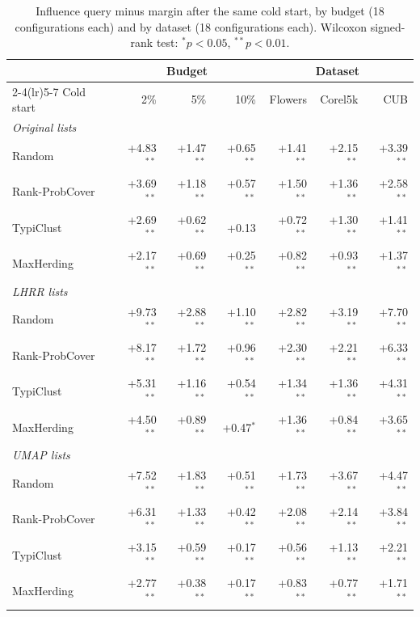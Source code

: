 \begin{table}[t]
\centering
\caption{Influence query minus margin after the same cold start, by budget (18 configurations each) and by dataset (18 configurations each). Wilcoxon signed-rank test: $^{*}p<0.05$, $^{**}p<0.01$.}
\label{tab:supp-plugin-breakdown}
\footnotesize
\begin{tabular}{lrrrrrr}
\toprule
& \multicolumn{3}{c}{Budget} & \multicolumn{3}{c}{Dataset} \\
\cmidrule(lr){2-4}\cmidrule(lr){5-7}
Cold start & 2\% & 5\% & 10\% & Flowers & Corel5k & CUB \\
\midrule
\multicolumn{7}{l}{\textit{Original lists}} \\
\quad Random & +4.83$^{**}$ & +1.47$^{**}$ & +0.65$^{**}$ & +1.41$^{**}$ & +2.15$^{**}$ & +3.39$^{**}$ \\
\quad Rank-ProbCover & +3.69$^{**}$ & +1.18$^{**}$ & +0.57$^{**}$ & +1.50$^{**}$ & +1.36$^{**}$ & +2.58$^{**}$ \\
\quad TypiClust & +2.69$^{**}$ & +0.62$^{**}$ & +0.13 & +0.72$^{**}$ & +1.30$^{**}$ & +1.41$^{**}$ \\
\quad MaxHerding & +2.17$^{**}$ & +0.69$^{**}$ & +0.25$^{**}$ & +0.82$^{**}$ & +0.93$^{**}$ & +1.37$^{**}$ \\
\multicolumn{7}{l}{\textit{LHRR lists}} \\
\quad Random & +9.73$^{**}$ & +2.88$^{**}$ & +1.10$^{**}$ & +2.82$^{**}$ & +3.19$^{**}$ & +7.70$^{**}$ \\
\quad Rank-ProbCover & +8.17$^{**}$ & +1.72$^{**}$ & +0.96$^{**}$ & +2.30$^{**}$ & +2.21$^{**}$ & +6.33$^{**}$ \\
\quad TypiClust & +5.31$^{**}$ & +1.16$^{**}$ & +0.54$^{**}$ & +1.34$^{**}$ & +1.36$^{**}$ & +4.31$^{**}$ \\
\quad MaxHerding & +4.50$^{**}$ & +0.89$^{**}$ & +0.47$^{*}$ & +1.36$^{**}$ & +0.84$^{**}$ & +3.65$^{**}$ \\
\multicolumn{7}{l}{\textit{UMAP lists}} \\
\quad Random & +7.52$^{**}$ & +1.83$^{**}$ & +0.51$^{**}$ & +1.73$^{**}$ & +3.67$^{**}$ & +4.47$^{**}$ \\
\quad Rank-ProbCover & +6.31$^{**}$ & +1.33$^{**}$ & +0.42$^{**}$ & +2.08$^{**}$ & +2.14$^{**}$ & +3.84$^{**}$ \\
\quad TypiClust & +3.15$^{**}$ & +0.59$^{**}$ & +0.17$^{**}$ & +0.56$^{**}$ & +1.13$^{**}$ & +2.21$^{**}$ \\
\quad MaxHerding & +2.77$^{**}$ & +0.38$^{**}$ & +0.17$^{**}$ & +0.83$^{**}$ & +0.77$^{**}$ & +1.71$^{**}$ \\
\bottomrule
\end{tabular}
\end{table}
